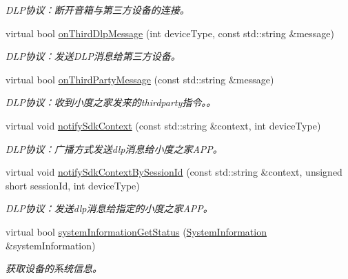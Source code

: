 \begin{DoxyCompactItemize}
\begin{DoxyCompactList}\small\item\em D\+L\+P协议：断开音箱与第三方设备的连接。 \end{DoxyCompactList}\item 
virtual bool \hyperlink{classduerOSDcsSDK_1_1sdkInterfaces_1_1ApplicationImplementation_a86a2762383d248b63f5f815f1fbdc2c5}{on\+Third\+Dlp\+Message} (int device\+Type, const std\+::string \&message)
\begin{DoxyCompactList}\small\item\em D\+L\+P协议：发送\+D\+L\+P消息给第三方设备。 \end{DoxyCompactList}\item 
virtual bool \hyperlink{classduerOSDcsSDK_1_1sdkInterfaces_1_1ApplicationImplementation_ab5b78477782d2aa18010d4da7cd45ca3}{on\+Third\+Party\+Message} (const std\+::string \&message)
\begin{DoxyCompactList}\small\item\em D\+L\+P协议：收到小度之家发来的thirdparty指令。。 \end{DoxyCompactList}\item 
virtual void \hyperlink{classduerOSDcsSDK_1_1sdkInterfaces_1_1ApplicationImplementation_a0e9c517a15e1933d5cb12e8032b34d90}{notify\+Sdk\+Context} (const std\+::string \&context, int device\+Type)
\begin{DoxyCompactList}\small\item\em D\+L\+P协议：广播方式发送dlp消息给小度之家\+A\+P\+P。 \end{DoxyCompactList}\item 
virtual void \hyperlink{classduerOSDcsSDK_1_1sdkInterfaces_1_1ApplicationImplementation_a43f7f49462fc094905cf38b69bb4e848}{notify\+Sdk\+Context\+By\+Session\+Id} (const std\+::string \&context, unsigned short session\+Id, int device\+Type)
\begin{DoxyCompactList}\small\item\em D\+L\+P协议：发送dlp消息给指定的小度之家\+A\+P\+P。 \end{DoxyCompactList}\item 
virtual bool \hyperlink{classduerOSDcsSDK_1_1sdkInterfaces_1_1ApplicationImplementation_aab4fcea97b804159073abf54e25075bb}{system\+Information\+Get\+Status} (\hyperlink{structduerOSDcsSDK_1_1sdkInterfaces_1_1SystemInformation}{System\+Information} \&system\+Information)
\begin{DoxyCompactList}\small\item\em 获取设备的系统信息。 \end{DoxyCompactList}\item 

\end{DoxyCompactItemize}
